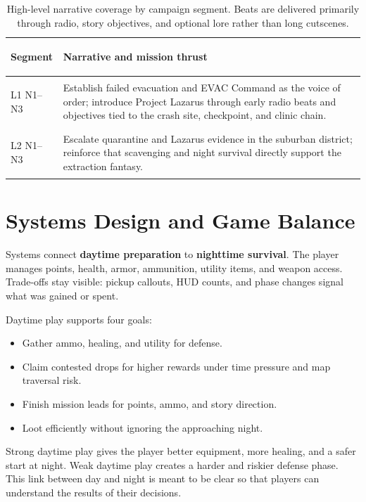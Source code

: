 \documentclass[11pt]{article}
\begin{document}
\begin{table}[H]
    \centering
    \begingroup
    \small
    \renewcommand{\arraystretch}{1.18}
    \setlength{\tabcolsep}{7pt}
    \begin{tabularx}{\textwidth}{>{\bfseries\raggedright\arraybackslash}p{} Y}
        \toprule
        Segment & Narrative and mission thrust \\
        \midrule
        L1 N1--N3 & Establish failed evacuation and EVAC Command as the voice of order; introduce Project Lazarus through early radio beats and objectives tied to the crash site, checkpoint, and clinic chain. \\
        \addlinespace[0.25em]
        L2 N1--N3 & Escalate quarantine and Lazarus evidence in the suburban district; reinforce that scavenging and night survival directly support the extraction fantasy. \\
        \bottomrule
    \end{tabularx}
    \endgroup
    \caption{High-level narrative coverage by campaign segment. Beats are delivered primarily through radio, story objectives, and optional lore rather than long cutscenes.}
\end{table}

\section{Systems Design and Game Balance}\label{sec:systems}

Systems connect \textbf{daytime preparation} to \textbf{nighttime survival}. The player manages points, health, armor, ammunition, utility items, and weapon access. Trade-offs stay visible: pickup callouts, HUD counts, and phase changes signal what was gained or spent.

Daytime play supports four goals:

\begin{itemize}
    \item Gather ammo, healing, and utility for defense.
    \item Claim contested drops for higher rewards under time pressure and map traversal risk.
    \item Finish mission leads for points, ammo, and story direction.
    \item Loot efficiently without ignoring the approaching night.
\end{itemize}

Strong daytime play gives the player better equipment, more healing, and a safer start at night. Weak daytime play creates a harder and riskier defense phase. This link between day and night is meant to be clear so that players can understand the results of their decisions.
\end{document}
